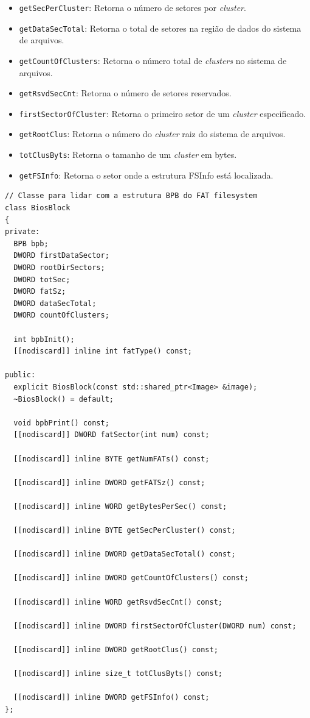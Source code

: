 \documentclass[
    12pt,				%
    oneside,   	        %
    a4paper,			%
    english,			%
    french,				%
    spanish,			%
    brazil,				%
    ]{pacotes/abntex2}
\begin{document}
\begin{itemize}
\begin{itemize}
            \item \texttt{getSecPerCluster}: Retorna o número de setores por \textit{cluster}.
            \item \texttt{getDataSecTotal}: Retorna o total de setores na região de dados do sistema de arquivos.
            \item \texttt{getCountOfClusters}: Retorna o número total de \textit{clusters} no sistema de arquivos.
            \item \texttt{getRsvdSecCnt}: Retorna o número de setores reservados.
            \item \texttt{firstSectorOfCluster}: Retorna o primeiro setor de um \textit{cluster} especificado.
            \item \texttt{getRootClus}: Retorna o número do \textit{cluster} raiz do sistema de arquivos.
            \item \texttt{totClusByts}: Retorna o tamanho de um \textit{cluster} em bytes.
            \item \texttt{getFSInfo}: Retorna o setor onde a estrutura FSInfo está localizada.
        \end{itemize}
\end{itemize}

\begin{lstlisting}[caption={Classe que abstrai a extração de informações da estrutura BPB}, label={lst:biosblock}]
// Classe para lidar com a estrutura BPB do FAT filesystem
class BiosBlock
{
private:
  BPB bpb;
  DWORD firstDataSector;
  DWORD rootDirSectors;
  DWORD totSec;
  DWORD fatSz;
  DWORD dataSecTotal;
  DWORD countOfClusters;

  int bpbInit();
  [[nodiscard]] inline int fatType() const;

public:
  explicit BiosBlock(const std::shared_ptr<Image> &image);
  ~BiosBlock() = default;

  void bpbPrint() const;
  [[nodiscard]] DWORD fatSector(int num) const;
  
  [[nodiscard]] inline BYTE getNumFATs() const;
  
  [[nodiscard]] inline DWORD getFATSz() const;
  
  [[nodiscard]] inline WORD getBytesPerSec() const;
  
  [[nodiscard]] inline BYTE getSecPerCluster() const;
  
  [[nodiscard]] inline DWORD getDataSecTotal() const;
  
  [[nodiscard]] inline DWORD getCountOfClusters() const;
  
  [[nodiscard]] inline WORD getRsvdSecCnt() const;
  
  [[nodiscard]] inline DWORD firstSectorOfCluster(DWORD num) const;
  
  [[nodiscard]] inline DWORD getRootClus() const;
  
  [[nodiscard]] inline size_t totClusByts() const;
  
  [[nodiscard]] inline DWORD getFSInfo() const;
};
\end{lstlisting}
\end{document}
